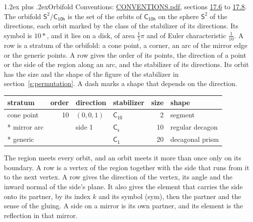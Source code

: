 \documentclass[10pt,a4paper]{article}
\makeatletter
\renewcommand\section{\@startsection{section}{1}{\z@}{-3ex plus -1ex minus -.2ex}%
  {1.2ex plus .2ex}{\normalfont\large\sffamily\bfseries\color{parttitle}}}
\numberwithin{equation}{section}
\newcommand{\grp}[1]{\mathsf{#1}}
\newcommand{\orbname}[1]{#1}
\newcommand{\dirvec}[3]{(#1, #2, #3)}
\newcommand{\twosphere}{\mathsf{S}^{2}}
\makeatother
\begin{document}
\section{Orbifold}\label{s:orbifold}
Conventions: \href{../../CONVENTIONS.pdf}{CONVENTIONS.pdf}, sections \href{../../CONVENTIONS.pdf\#conv.17.6}{17.6} to \href{../../CONVENTIONS.pdf\#conv.17.8}{17.8}.
The orbifold $\twosphere/\grp{C_{10h}}$ is the set of the orbits of $\grp{C_{10h}}$ on the sphere $\twosphere$ of the directions, each orbit marked by the class of the stabilizer of its directions. Its symbol is $\orbname{10{\ast}}$, and it lies on a disk, of area $\tfrac{1}{5}\pi$ and of Euler characteristic $\tfrac{1}{10}$.
\leavevmode\label{n:head.stratum}\label{n:head.order.point}\label{n:head.direction}\label{n:head.stabilizer}\label{n:head.size.orbit}\label{n:head.shape}A row is a stratum of the orbifold: a cone point, a corner, an arc of the mirror edge or the generic points. A row gives the order of its points, the direction of a point or the side of the region along an arc, and the stabilizer of its directions. Its orbit has the size and the shape of the figure of the stabilizer in section~\ref{s:permutation}. A dash marks a shape that depends on the direction.
{\small\setlength{\tabcolsep}{4pt}\begin{longtable}{@{}lrllrl@{}}\toprule
stratum & order & direction & stabilizer & size & shape\\\midrule\endhead
\bottomrule\endfoot\endlastfoot
cone point & 10 & $\dirvec{0}{0}{1}$ & \href{C10.pdf}{$\grp{C_{10}}$} & 2 & segment\\*
mirror arc &  & side 1 & \href{C1v.pdf}{$\grp{C_{s}}$} & 10 & regular decagon\\*
generic &  &  & \href{C1.pdf}{$\grp{C_{1}}$} & 20 & decagonal prism\\
\bottomrule\end{longtable}}
\leavevmode\label{n:head.vertex.region}\label{n:head.angle}\label{n:head.normal.side}\label{n:head.partner}\label{n:head.sense}The region meets every orbit, and an orbit meets it more than once only on its boundary. A row is a vertex of the region together with the side that runs from it to the next vertex. A row gives the direction of the vertex, its angle and the inward normal of the side's plane. It also gives the element that carries the side onto its partner, by its index $k$ and its symbol (sym), then the partner and the sense of the gluing. A side on a mirror is its own partner, and its element is the reflection in that mirror.
\end{document}

